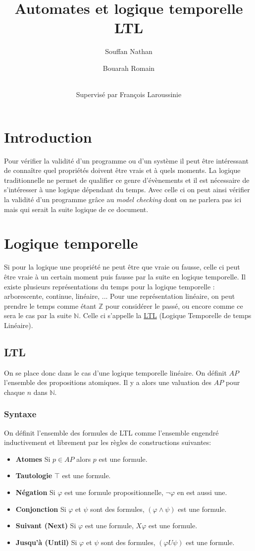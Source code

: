 \documentclass[12pt,a4paper]{article}
\title {Automates et logique temporelle LTL}
\author{
  Souffan Nathan \and
  Bouarah Romain \and
  \\Supervisé par François Laroussinie
}
\theoremstyle{plain}
\theoremstyle{definition}
\begin{document}
\maketitle
\newpage
\tableofcontents
\newpage

\section{Introduction}
Pour vérifier la validité d'un programme ou d'un système il peut être intéressant de connaître quel propriétés doivent être vrais et à quels moments. La logique traditionnelle ne permet de qualifier ce genre d'évènements et il est nécessaire de s'intéresser à une logique dépendant du temps. Avec celle ci on peut ainsi vérifier la validité d'un programme grâce au \emph{model checking} dont on ne parlera pas ici mais qui serait la suite logique de ce document.

\section{Logique temporelle}

Si pour la logique une propriété ne peut être que vraie ou fausse, celle ci peut être vraie à un certain moment puis fausse par la suite en logique temporelle.
Il existe plusieurs représentations du temps pour la logique temporelle : arborescente, continue, linéaire, ...
Pour une représentation linéaire, on peut prendre le temps comme étant $\mathbb{Z}$ pour considérer le passé, ou encore comme ce sera le cas par la suite $\mathbb{N}$.
Celle ci s'appelle la \underline{LTL} (Logique Temporelle de temps Linéaire).

\subsection{LTL}
On se place donc dans le cas d'une logique temporelle linéaire.
On définit $AP$ l'ensemble des propositions atomiques. Il y a alors une valuation des $AP$ pour chaque $n$ dans $\mathbb{N}$.

\subsubsection{Syntaxe}
On définit l'ensemble des formules de LTL comme l'ensemble engendré inductivement et librement par les règles de constructions suivantes:
\begin{itemize}
	\item[] \textbf{Atomes} Si $p \in AP$ alors $p$ est une formule.
	\item[] \textbf{Tautologie} $\top$ est une formule.
	\item[] \textbf{Négation} Si $\varphi$ est une formule propositionnelle, $\lnot \varphi$ en est aussi une.
	\item[] \textbf{Conjonction} Si $\varphi$ et $\psi$ sont des formules, $(\varphi\land \psi)$ est une formule.
	\item[] \textbf{Suivant (Next)} Si $\varphi$ est une formule, $X\varphi$ est une formule.
	\item[] \textbf{Jusqu'à (Until)} Si $\varphi$ et $\psi$ sont des formules, $(\varphi U \psi)$ est une formule.
\end{itemize}
\end{document}
